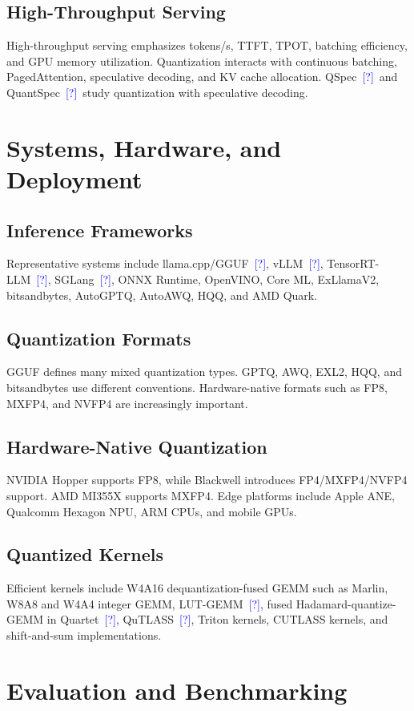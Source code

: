 \documentclass[journal,10pt]{IEEEtran}
\newcommand{\CITE}{\textcolor{blue}{[?]}}
\begin{document}
\subsection{High-Throughput Serving}
High-throughput serving emphasizes tokens/s, TTFT, TPOT, batching efficiency, and GPU memory utilization. Quantization interacts with continuous batching, PagedAttention, speculative decoding, and KV cache allocation. QSpec~\CITE\ and QuantSpec~\CITE\ study quantization with speculative decoding.

\section{Systems, Hardware, and Deployment}

\subsection{Inference Frameworks}
Representative systems include llama.cpp/GGUF~\CITE, vLLM~\CITE, TensorRT-LLM~\CITE, SGLang~\CITE, ONNX Runtime, OpenVINO, Core ML, ExLlamaV2, bitsandbytes, AutoGPTQ, AutoAWQ, HQQ, and AMD Quark.

\subsection{Quantization Formats}
GGUF defines many mixed quantization types. GPTQ, AWQ, EXL2, HQQ, and bitsandbytes use different conventions. Hardware-native formats such as FP8, MXFP4, and NVFP4 are increasingly important.

\subsection{Hardware-Native Quantization}
NVIDIA Hopper supports FP8, while Blackwell introduces FP4/MXFP4/NVFP4 support. AMD MI355X supports MXFP4. Edge platforms include Apple ANE, Qualcomm Hexagon NPU, ARM CPUs, and mobile GPUs.

\subsection{Quantized Kernels}
Efficient kernels include W4A16 dequantization-fused GEMM such as Marlin, W8A8 and W4A4 integer GEMM, LUT-GEMM~\CITE, fused Hadamard-quantize-GEMM in Quartet~\CITE, QuTLASS~\CITE, Triton kernels, CUTLASS kernels, and shift-and-sum implementations.

\section{Evaluation and Benchmarking}
\end{document}
